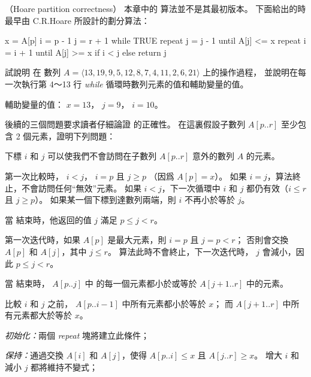 \startPROBLEM
（Hoare partition correctness）
本章中的  算法並不是其最初版本。
下面給出的時最早由 C.R.Hoare 所設計的劃分算法：

\startCLRSCODE
x = A[p]
i = p - 1
j = r + 1
while TRUE
	repeat
		j = j - 1
	until A[j] <= x
	repeat
		i = i + 1
	until A[j] >= x
	if i < j
	else
		return j
\stopCLRSCODE
\startigBase[a]
\item 試說明  在
數列 $A = \langle 13, 19, 9, 5, 12, 8, 7, 4, 11, 2, 6, 21 \rangle$ 上的操作過程，
並說明在每一次執行第 4～13 行 \emph{while} 循環時數列元素的值和輔助變量的值。
\stopigBase

\startANSWER
輔助變量的值： $x = 13$， $j = 9$， $i = 10$。

{\externalfigure[output/p7_1_a-1]}
{\externalfigure[output/p7_1_a-2]}
{\externalfigure[output/p7_1_a-3]}
\stopANSWER

後續的三個問題要求讀者仔細論證  的正確性。
在這裏假設子數列 $A[p..r]$ 至少包含 2 個元素，證明下列問題：
\startigBase[a,continue]
\item 下標 $i$ 和 $j$ 可以使我們不會訪問在子數列 $A[p..r]$ 意外的數列 $A$ 的元素。
\stopigBase

\startANSWER
第一次比較時， $i < j$， $i=p$ 且 $j\ge p$ （因爲 $A[p]=x$）。
如果 $i=j$，算法終止，不會訪問任何“無效”元素。
如果 $i<j$，下一次循環中 $i$ 和 $j$ 都仍有效（$i\le r$ 且 $j\ge p$）。
如果某一個下標到達數列兩端，則 $i$ 不再小於等於 $j$。
\stopANSWER

\startigBase[a,continue]
\item 當  結束時，他返回的值 $j$ 滿足 $p\le j < r$。
\stopigBase

\startANSWER
第一次迭代時，如果 $A[p]$ 是最大元素，則 $i=p$ 且 $j=p<r$；
否則會交換 $A[p]$ 和 $A[j]$，其中 $j\le r$。
算法此時不會終止，下一次迭代時， $j$ 會減小，因此 $p\le j < r$。
\stopANSWER

\startigBase[a,continue]
\item 當  結束時， $A[p..j]$ 中
的每一個元素都小於或等於 $A[j+1..r]$ 中的元素。
\stopigBase

\startANSWER
比較 $i$ 和 $j$ 之前， $A[p..i-1]$ 中所有元素都小於等於 $x$；
而 $A[j+1..r]$ 中所有元素都大於等於 $x$。

\emph{初始化：}兩個 \emph{repeat} 塊將建立此條件；

\emph{保持：}通過交換 $A[i]$ 和 $A[j]$，使得 $A[p..i]\le x$ 且 $A[j..r]\ge x$。
增大 $i$ 和減小 $j$ 都將維持不變式；

